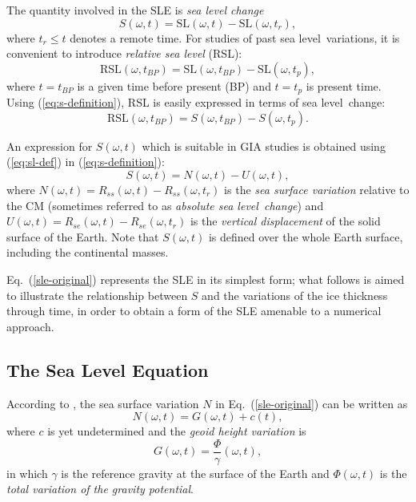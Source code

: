 \documentclass[11pt,fleqn,a4paper,titlepage]{article}
\newcommand\sealevel{sea level~}
\begin{document}
The quantity involved in the SLE is \emph{sea level change}
\begin{equation}\label{eq:s-definition}
S(\omega, t) = \textrm{SL}(\omega,t) - \textrm{SL}(\omega,t_{r}), 
\end{equation}
where $t_{r} \le t$ denotes a remote time. For studies 
of past \sealevel variations, it is convenient to introduce 
\emph{relative sea level} (RSL):
\begin{equation}
\textrm{RSL}(\omega,t_{BP})=\textrm{SL}(\omega,t_{BP})- \textrm{SL}(\omega,t_{p}),
\end{equation}
where $t=t_{BP}$ is a given time before present (BP) and $t=t_p$ is present time. 
Using (\ref{eq:s-definition}), {RSL} is easily expressed in terms of \sealevel change: 
\begin{equation}\label{eq:rsl-vs-s}
\textrm{RSL}(\omega,t_{BP})= {S}(\omega,t_{BP})- {S}(\omega,t_{p}).
\end{equation}

An expression for $S(\omega, t)$ which is suitable in GIA studies is 
obtained using (\ref{eq:sl-def}) in
(\ref{eq:s-definition}): 
\begin{equation}\label{sle-original}
S(\omega, t) = N(\omega,t) - U(\omega,t), 
\end{equation}
where $N(\omega,t)= R_{ss}(\omega,t) - R_{ss}(\omega,t_r)$ is the \textit{sea surface variation} relative to the CM (sometimes referred to as \emph{absolute \sealevel change}) and $U(\omega,t)= R_{se}(\omega,t) - R_{se}(\omega,t_r)$ is the \emph{vertical displacement} of the solid surface of the Earth. Note that $S(\omega, t)$ is defined over the whole Earth surface, including the continental masses. 

Eq.~(\ref{sle-original}) represents the SLE in its simplest form; 
what follows is aimed to illustrate the relationship between $S$ and the variations of the ice thickness through time, in order to obtain a form of the SLE amenable to a numerical approach. 

\subsection{The Sea Level Equation}\label{sec:sle}

According to \citet{Farrell_and_Clark_1976}, the sea surface variation $N$ in Eq.~(\ref{sle-original}) can be written as 
\begin{equation}\label{n_sle}
{N}(\omega, t) = G(\omega, t) + c(t),  
\end{equation}
where $c$ is yet undetermined and the \emph{geoid height variation} is 
\begin{equation}\label{g_sle}
G(\omega, t) = \frac{\Phi}{\gamma}(\omega, t),  
\end{equation}
in which $\gamma$ is the reference gravity at the surface of the Earth and $\Phi(\omega,t)$ is the 
\emph{total
variation of the gravity potential}. 
\end{document}
